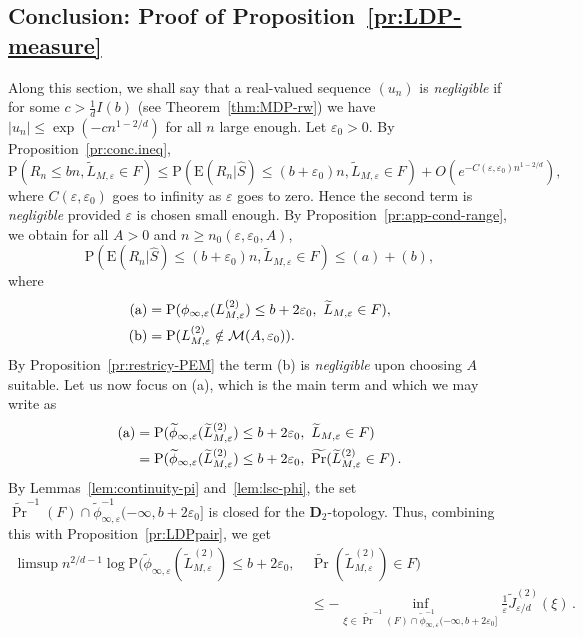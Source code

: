 \documentclass[a4paper,11pt]{amsart}
\numberwithin{equation}{section}
\newcommand{\cM}{{\ensuremath{\mathcal M}} }
\newcommand{\gep}{\varepsilon}
\newcommand{\bfD}{\mathbf{D}}
\renewcommand{\tilde}{\widetilde}          %
\newcommand\bP{\ensuremath{\mathrm{P}}}
\newcommand\bE{\ensuremath{\mathrm{E}}}
\newcommand{\8}{\infty}
\newcommand{\beq}{\begin{equation}}
\newcommand{\eeq}{\end{equation}}
\newcommand{\ba}{\begin{aligned}}
\newcommand{\ea}{\end{aligned}}
\begin{document}
\subsection{Conclusion: Proof of Proposition~\ref{pr:LDP-measure}}
\label{sec:conclusion-proof}
Along this section, we shall say that a real-valued sequence $(u_n)$ is \emph{negligible} if for some $c > \frac1d I(b)$ (see Theorem~\ref{thm:MDP-rw}) we have $|u_n| \le \exp(-cn^{1-2/d})$ for all $n$ large enough.
Let $\gep_0>0$. By Proposition~\ref{pr:conc.ineq},
\beq
\bP(R_n\le bn, \tilde L_{M,\gep}\in F) \le
\bP(\bE(R_n | \hat S)\le (b+\gep_0)n, \tilde L_{M,\gep}\in F) +O(e^{-C(\gep,\gep_0)n^{1-2/d}}),
\eeq
where $C(\gep,\gep_0)$ goes to infinity as $\gep$ goes to zero. Hence the second term is \emph{negligible} provided $\gep$ is chosen small enough.
By Proposition~\ref{pr:app-cond-range}, we obtain for all $A>0$ and $n\ge n_0(\gep,\gep_0,A)$,
\beq
\bP(\bE(R_n | \hat S)\le (b+\gep_0)n, \tilde L_{M,\gep}\in F) \le (a) + (b),
\eeq
where
\beq
\ba
{\rm (a)} &= \bP(\phi_{\infty,\gep}(L^{(2)}_{M,\gep})\le b+2\gep_0,\ \tilde L_{M,\gep}\in F),\\
{\rm (b) } &= \bP(L^{(2)}_{M,\gep}\notin \cM(A,\gep_0)).
\ea
\eeq
By Proposition~\ref{pr:restricy-PEM} the term (b) is \emph{negligible} upon choosing $A$ suitable. Let us now focus on (a), which is the main term and which we may write as
\beq
\ba
{\rm (a)} &= \bP(\tilde\phi_{\infty,\gep}(\tilde L^{(2)}_{M,\gep})\le b+2\gep_0,\  \tilde L_{M,\gep}\in F)\\
&= \bP(\tilde\phi_{\infty,\gep}(\tilde L^{(2)}_{M,\gep})\le b+2\gep_0,\ \tilde\Pr(\tilde L^{(2)}_{M,\gep}\in F)\,.
\ea
\eeq
By Lemmas~\ref{lem:continuity-pi} and~\ref{lem:lsc-phi}, the set $\tilde\Pr^{-1}(F)\cap \tilde\phi_{\infty,\gep}^{-1}(-\infty,b+2\gep_0]$ is closed for the $\bfD_2$-topology. Thus, combining this with Proposition~\ref{pr:LDPpair},
we get
\beq
\ba
\label{eq:UB-LDPpair}
\limsup n^{2/d -1}\log \bP(\tilde\phi_{\infty,\gep}(\tilde L^{(2)}_{M,\gep})\le b+2\gep_0,\ &\tilde\Pr(\tilde L^{(2)}_{M,\gep})\in F)\\ &\le -
\inf_{\xi\in\tilde\Pr^{-1}(F)\cap \tilde\phi_{\infty,\gep}^{-1}(-\infty,b+2\gep_0]} \frac{1}{\gep} \tilde J^{(2)}_{ \gep/d}(\xi)\,.
\ea
\eeq
\end{document}
